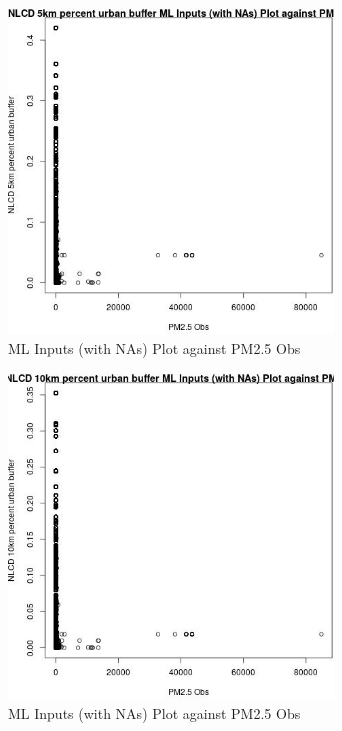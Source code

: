 \begin{figure} 
\centering  
\includegraphics[width=0.77\textwidth]{Code_Outputs/Report_ML_input_PM25_Step4_part_f_de_duplicated_aveswNAs_NLCD_5km_percent_urban_buffervPM25_Obs.jpg} 
\caption{\label{fig:Report_ML_input_PM25_Step4_part_f_de_duplicated_aveswNAsNLCD_5km_percent_urban_buffervPM25_Obs}ML Inputs (with NAs) Plot against PM2.5 Obs} 
\end{figure} 
 

\clearpage 

\begin{figure} 
\centering  
\includegraphics[width=0.77\textwidth]{Code_Outputs/Report_ML_input_PM25_Step4_part_f_de_duplicated_aveswNAs_NLCD_10km_percent_urban_buffervPM25_Obs.jpg} 
\caption{\label{fig:Report_ML_input_PM25_Step4_part_f_de_duplicated_aveswNAsNLCD_10km_percent_urban_buffervPM25_Obs}ML Inputs (with NAs) Plot against PM2.5 Obs} 
\end{figure} 
 

